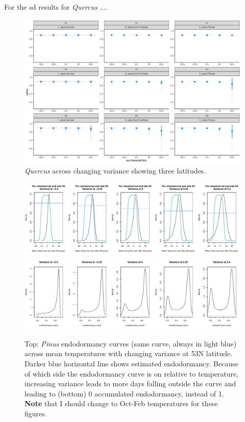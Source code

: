 \documentclass[11pt,letter]{article}
\begin{document}
\clearpage

For the sd results for \emph{Quercus} ....

\begin{figure} 
 \begin{center}
\noindent \includegraphics[width=1\textwidth]{..//analyses/graphs/phenofit/sims/metrics3/sdsim_3metricsQR.pdf}
  \caption{\emph{Quercus} across changing variance showing three latitudes.}
  \label{fig:quercussd3}
  \end{center}
\end{figure}

\begin{figure} 
 \begin{center}
\noindent \includegraphics[width=1\textwidth]{..//analyses/graphs/phenofit/sims/extras/flowerendodormPinusMeanTemp53.pdf}
\noindent \includegraphics[width=1\textwidth]{..//analyses/graphs/phenofit/sims/extras/flowerendodormPinus53.pdf}
  \caption{Top: \emph{Pinus} endodormancy curves (same curve, always in light blue) across mean temperatures with changing variance at 53\degree N latitude. Darker blue horizontal line shows estimated endodormancy. Because of which side the endodormancy curve is on relative to temperature, increasing variance leads to more days falling outside the curve and leading to (bottom) 0 accumulated endodormancy, instead of 1. {\bf Note} that I should change to Oct-Feb temperatures for these figures.}
  \label{fig:pinusendodorm53}
  \end{center}
\end{figure}
\end{document}
